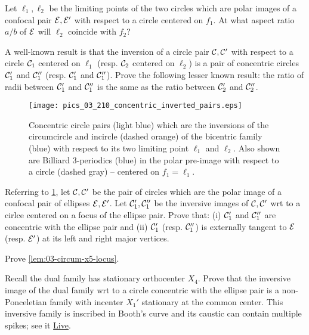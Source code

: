 \begin{exercise}
Let $\ell_1,\ell_2$ be the limiting points of the two circles which are polar images of a confocal pair $\mathcal{E},\mathcal{E}'$ with respect to a circle centered on $f_1$. At what aspect ratio $a/b$ of $\mathcal{E}$ will $\ell_2$ coincide with $f_2$?
\end{exercise}

\begin{exercise}
A well-known result is that the inversion of a circle pair $\mathcal{C},\mathcal{C}'$ with respect to a circle $\mathcal{C}_1$ centered on $\ell_1$ (resp. $\mathcal{C}_2$ centered on $\ell_2$) is a pair of concentric circles $\mathcal{C}_1'$ and $\mathcal{C}_1''$ (resp. $\mathcal{C}_1'$ and $\mathcal{C}_1''$). Prove the following lesser known result: the ratio of radii between $\mathcal{C}_1'$ and $\mathcal{C}_1''$ is the same as the ratio between $\mathcal{C}_2'$ and $\mathcal{C}_2''$. 
\end{exercise}


\begin{figure}
    \centering
    \texttt{[image: pics\_03\_210\_concentric\_inverted\_pairs.eps]}
    \caption{Concentric circle pairs (light blue) which are the inversions of the circumcircle and incircle (dashed orange) of the bicentric family  (blue) with respect to its two limiting point $\ell_1$ and $\ell_2$. Also shown are Billiard 3-periodics (blue) in the polar pre-image with respect to a circle (dashed gray) -- centered on $f_1=\ell_1$.}
    \label{fig:03-concentric-inverted}
\end{figure}

\begin{exercise}
Referring to \cref{fig:03-concentric-inverted}, let $\mathcal{C},\mathcal{C}'$ be the pair of circles which are the polar image of a confocal pair of ellipses $\mathcal{E},\mathcal{E}'$. Let $\mathcal{C}_1', \mathcal{C}_1''$ be the inversive images of $\mathcal{C},\mathcal{C}'$ wrt to a cirlce centered on a focus of the ellipse pair. Prove that: (i) $\mathcal{C}_1'$ and $\mathcal{C}_1''$ are concentric with the ellipse pair and (ii) $\mathcal{C}_1'$ (resp. $\mathcal{C}_1''$) is externally tangent to $\mathcal{E}$ (resp. $\mathcal{E}'$) at its left and right major vertices.
\end{exercise}

\begin{exercise}
Prove \cref{lem:03-circum-x5-locus}.
\label{ex:03-circum-x5-locus}
\end{exercise}

\begin{exercise}
Recall the dual family has stationary orthocenter $X_4$. Prove that the inversive image of the dual family wrt to a circle concentric with the ellipse pair is a non-Ponceletian family with incenter $X_1'$ stationary at the common center. This inversive family is inscribed in Booth's curve and its caustic can contain multiple spikes; see it \href{https://bit.ly/3vCCe05}{Live}.
\end{exercise}

